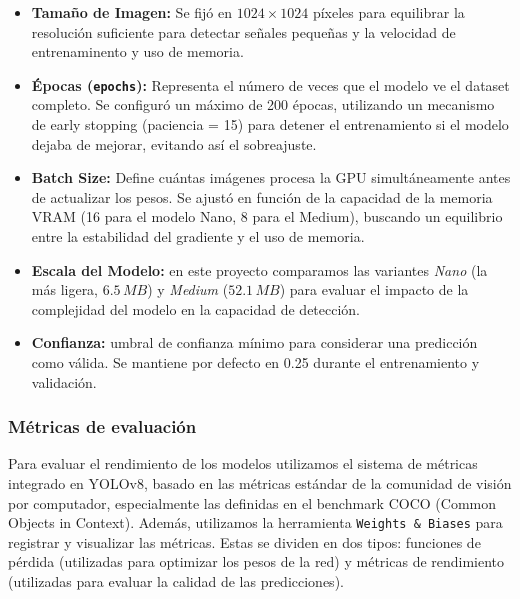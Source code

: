 \documentclass[11pt,a4paper]{article}
\begin{document}
\begin{itemize}
    \item \textbf{Tamaño de Imagen:} Se fijó en $1024 \times 1024$ píxeles para equilibrar la resolución suficiente para detectar señales pequeñas
            y la velocidad de entrenaminento y uso de memoria.
    
    \item \textbf{Épocas (\texttt{epochs}):} Representa el número de veces que el modelo ve el dataset completo. 
     Se configuró un máximo de 200 épocas, utilizando un mecanismo de early stopping
     (paciencia = 15) para detener el entrenamiento si el modelo dejaba de mejorar, 
     evitando así el sobreajuste.
    
    \item \textbf{Batch Size:} Define cuántas imágenes procesa la GPU simultáneamente antes de actualizar 
    los pesos. Se ajustó en función de la capacidad de la memoria VRAM (16 para el modelo Nano, 8 para el Medium), buscando un equilibrio entre la estabilidad del gradiente y el uso de memoria.
    
    \item \textbf{Escala del Modelo:} en este proyecto comparamos las variantes 
    \textit{Nano} (la más ligera, $6.5\, MB$) y \textit{Medium} ($52.1\, MB$) para evaluar el impacto de la complejidad 
    del modelo en la capacidad de detección.

    \item \textbf{Confianza:} umbral de confianza mínimo para considerar una predicción como válida.
    Se mantiene por defecto en 0.25 durante el entrenamiento y validación.
\end{itemize}

\subsubsection{Métricas de evaluación}

Para evaluar el rendimiento de los modelos utilizamos
el sistema de métricas integrado en YOLOv8, basado en las métricas estándar de la comunidad
de visión por computador, especialmente las definidas en el benchmark COCO (Common Objects in Context).
Además, utilizamos la herramienta \texttt{Weights \& Biases} para registrar y visualizar las métricas. Estas
se dividen en dos tipos: funciones de pérdida (utilizadas para optimizar los pesos de la red) y
métricas de rendimiento (utilizadas para evaluar la calidad de las predicciones).
\end{document}
